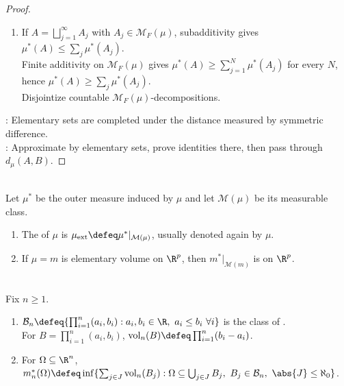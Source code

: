\begin{theorem}
\begin{proof}
\begin{enumerate}[label=(\roman*)]
\item If $A=\bigsqcup_{j=1}^{\infty}A_j$ with $A_j\in\mathcal{M}_F(\mu)$, subadditivity gives $\mu^\ast(A)\leq\sum_j\mu^\ast(A_j)$.\\
Finite additivity on $\mathcal{M}_F(\mu)$ gives $\mu^\ast(A)\geq\sum_{j=1}^{N}\mu^\ast(A_j)$ for every $N$, hence $\mu^\ast(A)\geq\sum_j\mu^\ast(A_j)$.\\
Disjointize countable $\mathcal{M}_F(\mu)$-decompositions.
\end{enumerate}
: Elementary sets are completed under the distance measured by symmetric difference.\\
: Approximate by elementary sets, prove identities there, then pass through $d_\mu(A,B)$.
\end{proof}
\end{theorem}

\begin{definition} \label{def:extended-and-lebesgue-measure} \\
Let $\mu^\ast$ be the outer measure induced by $\mu$ and let $\mathcal{M}(\mu)$ be its measurable class.
\begin{enumerate}[label=(\roman*)]
\setlength{\itemsep}{0pt}
\item The  of $\mu$ is $\mu_{\mathrm{ext}}\defeq\mu^\ast|_{\mathcal{M}(\mu)}$, usually denoted again by $\mu$.
\item If $\mu=m$ is elementary volume on $\R^p$, then $m^\ast|_{\mathcal{M}(m)}$ is  on $\R^p$.
\end{enumerate}
\end{definition}

\begin{definition} \label{def:tao-box-cover-outer-measure} \\
Fix $n\geq1$.
\begin{enumerate}[label=(\roman*)]
\setlength{\itemsep}{0pt}
\item $\mathcal{B}_n\defeq\{\prod_{i=1}^{n}(a_i,b_i):a_i,b_i\in\R,\ a_i\leq b_i\ \forall i\}$ is the class of .\\
For $B=\prod_{i=1}^{n}(a_i,b_i)$, $\operatorname{vol}_n(B)\defeq\prod_{i=1}^{n}(b_i-a_i)$.
\item For $\Omega\subseteq\R^n$, $m_n^\ast(\Omega)\defeq\inf\{\sum_{j\in J}\operatorname{vol}_n(B_j):\Omega\subseteq\bigcup_{j\in J}B_j,\ B_j\in\mathcal{B}_n,\ \abs{J}\leq\aleph_0\}$.
\end{enumerate}
\end{definition}

